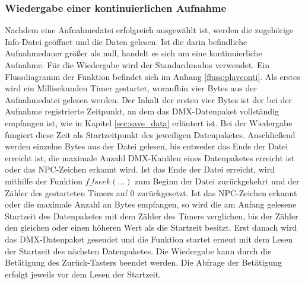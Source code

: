 
\subsubsection{Wiedergabe einer kontinuierlichen Aufnahme}
Nachdem eine Aufnahmedatei erfolgreich ausgewählt ist, werden die zugehörige Info-Datei geöffnet und die Daten gelesen. Ist die darin befindliche Aufnahmedauer größer als null, handelt es sich um eine kontinuierliche Aufnahme. Für die Wiedergabe wird der Standardmodus verwendet. Ein Flussdiagramm der Funktion befindet sich im Anhang \ref{fluss:playconti}. Als erstes wird ein Millisekunden Timer gestartet, woraufhin vier Bytes aus der Aufnahmedatei gelesen werden. Der Inhalt der ersten vier Bytes ist der bei der Aufnahme registrierte Zeitpunkt, an dem das DMX-Datenpaket vollständig empfangen ist, wie in Kapitel \ref{sec:save_data} erläutert ist. Bei der Wiedergabe fungiert diese Zeit als Startzeitpunkt des jeweiligen Datenpaketes. Anschließend werden einzelne Bytes aus der Datei gelesen, bis entweder das Ende der Datei erreicht ist, die maximale Anzahl DMX-Kanälen eines Datenpaketes erreicht ist oder das NPC-Zeichen erkannt wird. Ist das Ende der Datei erreicht, wird mithilfe der Funktion $f\_lseek(...)$ zum Beginn der Datei zurückgekehrt und der Zähler des gestarteten Timers auf 0 zurückgesetzt. Ist das NPC-Zeichen erkannt oder die maximale Anzahl an Bytes empfangen, so wird die am Anfang gelesene Startzeit des Datenpaketes mit dem Zähler des Timers verglichen, bis der Zähler den gleichen oder einen höheren Wert als die Startzeit besitzt. Erst danach wird das DMX-Datenpaket gesendet und die Funktion startet erneut mit dem Lesen der Startzeit des nächsten Datenpaketes. Die Wiedergabe kann durch die Betätigung des Zurück-Tasters beendet werden. Die Abfrage der Betätigung erfolgt jeweils vor dem Lesen der Startzeit.

